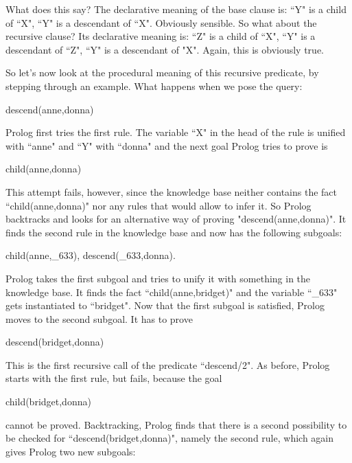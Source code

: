 What does this say?  The declarative meaning of the base clause
is:  ``Y" is a child of ``X",  ``Y" is a
descendant of ``X". Obviously sensible.
So what about the recursive clause?  Its declarative meaning is:
 ``Z" is a child of ``X",  ``Y" is a
descendant of ``Z",  ``Y" is a descendant of
"X". Again, this is obviously true.

So let's now look at the procedural meaning of this recursive
predicate, by stepping through an example. What happens when we pose
the query:
\begin{LPNcodedisplay}
descend(anne,donna)
\end{LPNcodedisplay}
Prolog first tries the first rule. The variable ``X" in the head
of the rule is unified with ``anne" and ``Y" with ``donna"  and
the next goal Prolog tries to prove is

\begin{LPNcodedisplay}
child(anne,donna)
\end{LPNcodedisplay}


This attempt fails, however, since the knowledge base
neither contains the fact ``child(anne,donna)" nor any rules
that would allow to infer it.
So Prolog backtracks and looks for an alternative way of proving
"descend(anne,donna)". It finds the second rule in the
knowledge base and now has the following subgoals:

\begin{LPNcodedisplay}
child(anne,_633),
descend(_633,donna).
\end{LPNcodedisplay}


Prolog takes the first subgoal and tries to unify  it with something in
the knowledge base. It finds the fact ``child(anne,bridget)"
and the variable ``\_633" gets instantiated to ``bridget".
Now that the first subgoal is satisfied, Prolog moves to the
second subgoal. It has to prove

\begin{LPNcodedisplay}
descend(bridget,donna)
\end{LPNcodedisplay}


This is the first recursive call of the predicate ``descend/2". As
before, Prolog starts with the first rule, but fails, because the goal

\begin{LPNcodedisplay}
child(bridget,donna)
\end{LPNcodedisplay}
cannot be proved. Backtracking, Prolog finds that there is a second
possibility to be checked for ``descend(bridget,donna)", namely the
second rule, which again gives Prolog two new subgoals:

